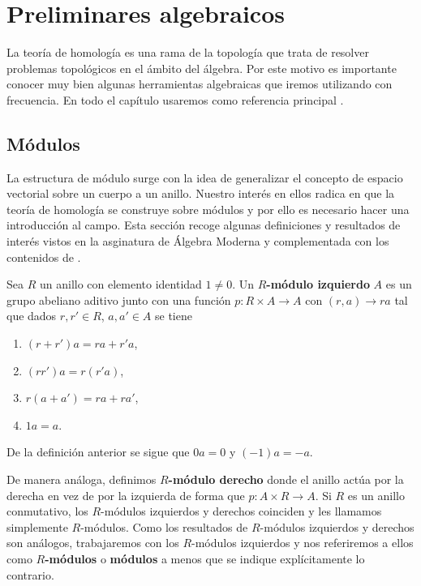 
\chapter{Preliminares algebraicos}
La teoría de homología es una rama de la topología que trata de resolver
problemas topológicos en el ámbito del álgebra. Por este motivo es importante
conocer muy bien algunas herramientas algebraicas que iremos utilizando con
frecuencia. En todo el capítulo usaremos como referencia principal
\cite{maclane2012homology}.

\section{Módulos}

La estructura de módulo surge con la idea de generalizar el concepto de espacio
vectorial sobre un cuerpo a un anillo. Nuestro interés en ellos radica en que
la teoría de homología se construye sobre módulos y por ello es necesario hacer
una introducción al campo. Esta sección recoge algunas definiciones y
resultados de interés vistos en la asginatura de Álgebra Moderna y
complementada con los contenidos de \cite{dummit2004abstract}.

\begin{definicion}
	Sea $R$ un anillo con elemento identidad $1 \neq 0$. Un \textbf{$R$-módulo izquierdo} $A$ es un grupo abeliano aditivo junto con una función $p: R \times A \rightarrow A$ con $(r, a) \to ra$ tal que dados $r,r' \in R$, $a,a' \in A$ se tiene
	\begin{enumerate}
		\item $(r+r') a = r a + r' a$,
		\item $(rr') a = r (r' a)$,
		\item $r(a+a') = ra + ra'$,
		\item $1a = a$.
	\end{enumerate}
\end{definicion}

De la definición anterior se sigue que $0a = 0$ y $(-1)a = -a$.

De manera análoga, definimos \textbf{$R$-módulo derecho} donde el anillo actúa
por la derecha en vez de por la izquierda de forma que $p: A \times R
	\rightarrow A$. Si $R$ es un anillo conmutativo, los $R$-módulos izquierdos y
derechos coinciden y les llamamos simplemente $R$-módulos. Como los resultados
de $R$-módulos izquierdos y derechos son análogos, trabajaremos con los
$R$-módulos izquierdos y nos referiremos a ellos como \textbf{$R$-módulos} o
\textbf{módulos} a menos que se indique explícitamente lo contrario.

